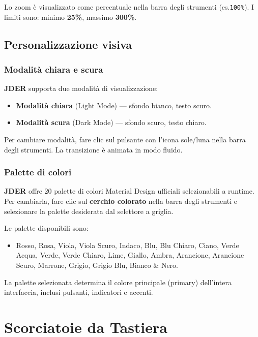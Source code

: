 \documentclass[a4paper,11pt]{article}
\newcommand{\jder}{\textbf{JDER}}
\begin{document}
Lo zoom è visualizzato come percentuale nella barra degli strumenti (es.\@ \texttt{100\%}).
I limiti sono: minimo \textbf{25\%}, massimo \textbf{300\%}.

\subsection{Personalizzazione visiva}

\subsubsection{Modalità chiara e scura}

\jder{} supporta due modalità di visualizzazione:
\begin{itemize}
  \item \textbf{Modalità chiara} (Light Mode) --- sfondo bianco, testo scuro.
  \item \textbf{Modalità scura} (Dark Mode) --- sfondo scuro, testo chiaro.
\end{itemize}

Per cambiare modalità, fare clic sul pulsante con l'icona sole/luna nella barra degli strumenti.
La transizione è animata in modo fluido.

\subsubsection{Palette di colori}

\jder{} offre 20 palette di colori Material Design ufficiali selezionabili a runtime.
Per cambiarla, fare clic sul \textbf{cerchio colorato} nella barra degli strumenti e selezionare
la palette desiderata dal selettore a griglia.

Le palette disponibili sono:
\begin{itemize}
  \item Rosso, Rosa, Viola, Viola Scuro, Indaco, Blu, Blu Chiaro, Ciano,
        Verde Acqua, Verde, Verde Chiaro, Lime, Giallo, Ambra, Arancione,
        Arancione Scuro, Marrone, Grigio, Grigio Blu, Bianco \& Nero.
\end{itemize}

La palette selezionata determina il colore principale (primary) dell'intera interfaccia,
inclusi pulsanti, indicatori e accenti.

\section{Scorciatoie da Tastiera}
\label{sec:shortcuts}
\end{document}
